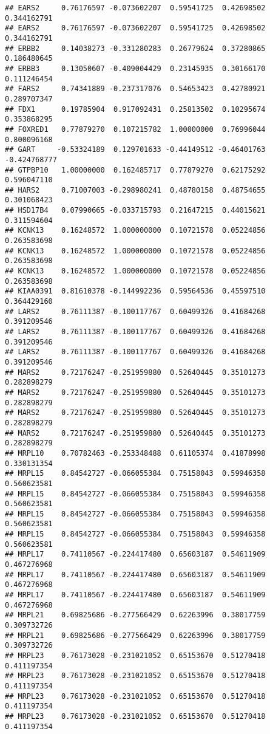 \documentclass[
]{article}
\begin{document}
\begin{verbatim}
## EARS2     0.76176597 -0.073602207  0.59541725  0.42698502  0.344162791
## EARS2     0.76176597 -0.073602207  0.59541725  0.42698502  0.344162791
## ERBB2     0.14038273 -0.331280283  0.26779624  0.37280865  0.186480645
## ERBB3     0.13050607 -0.409004429  0.23145935  0.30166170  0.111246454
## FARS2     0.74341889 -0.237317076  0.54653423  0.42780921  0.289707347
## FDX1      0.19785904  0.917092431  0.25813502  0.10295674  0.353868295
## FOXRED1   0.77879270  0.107215782  1.00000000  0.76996044  0.800096168
## GART     -0.53324189  0.129701633 -0.44149512 -0.46401763 -0.424768777
## GTPBP10   1.00000000  0.162485717  0.77879270  0.62175292  0.596047110
## HARS2     0.71007003 -0.298980241  0.48780158  0.48754655  0.301068423
## HSD17B4   0.07990665 -0.033715793  0.21647215  0.44015621  0.311594604
## KCNK13    0.16248572  1.000000000  0.10721578  0.05224856  0.263583698
## KCNK13    0.16248572  1.000000000  0.10721578  0.05224856  0.263583698
## KCNK13    0.16248572  1.000000000  0.10721578  0.05224856  0.263583698
## KIAA0391  0.81610378 -0.144992236  0.59564536  0.45597510  0.364429160
## LARS2     0.76111387 -0.100117767  0.60499326  0.41684268  0.391209546
## LARS2     0.76111387 -0.100117767  0.60499326  0.41684268  0.391209546
## LARS2     0.76111387 -0.100117767  0.60499326  0.41684268  0.391209546
## MARS2     0.72176247 -0.251959880  0.52640445  0.35101273  0.282898279
## MARS2     0.72176247 -0.251959880  0.52640445  0.35101273  0.282898279
## MARS2     0.72176247 -0.251959880  0.52640445  0.35101273  0.282898279
## MARS2     0.72176247 -0.251959880  0.52640445  0.35101273  0.282898279
## MRPL10    0.70782463 -0.253348488  0.61105374  0.41878998  0.330131354
## MRPL15    0.84542727 -0.066055384  0.75158043  0.59946358  0.560623581
## MRPL15    0.84542727 -0.066055384  0.75158043  0.59946358  0.560623581
## MRPL15    0.84542727 -0.066055384  0.75158043  0.59946358  0.560623581
## MRPL15    0.84542727 -0.066055384  0.75158043  0.59946358  0.560623581
## MRPL17    0.74110567 -0.224417480  0.65603187  0.54611909  0.467276968
## MRPL17    0.74110567 -0.224417480  0.65603187  0.54611909  0.467276968
## MRPL17    0.74110567 -0.224417480  0.65603187  0.54611909  0.467276968
## MRPL21    0.69825686 -0.277566429  0.62263996  0.38017759  0.309732726
## MRPL21    0.69825686 -0.277566429  0.62263996  0.38017759  0.309732726
## MRPL23    0.76173028 -0.231021052  0.65153670  0.51270418  0.411197354
## MRPL23    0.76173028 -0.231021052  0.65153670  0.51270418  0.411197354
## MRPL23    0.76173028 -0.231021052  0.65153670  0.51270418  0.411197354
## MRPL23    0.76173028 -0.231021052  0.65153670  0.51270418  0.411197354

\end{verbatim}
\end{document}
